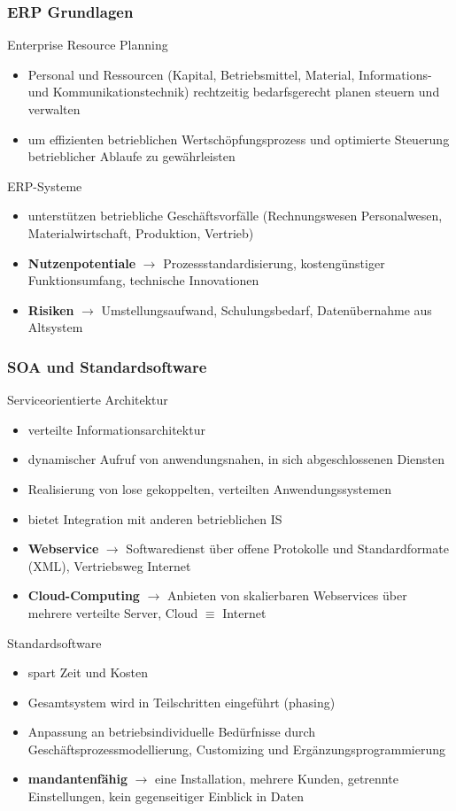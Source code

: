 \subsubsection{ERP Grundlagen}
Enterprise Resource Planning

\begin{itemize}
  \item Personal und Ressourcen (Kapital, Betriebsmittel, Material, Informations- und Kommunikationstechnik) rechtzeitig bedarfsgerecht planen steuern und verwalten
  \item um effizienten betrieblichen Wertschöpfungsprozess und optimierte Steuerung betrieblicher Ablaufe zu gewährleisten
\end{itemize}

ERP-Systeme

\begin{itemize}
  \item unterstützen betriebliche Geschäftsvorfälle (Rechnungswesen Personalwesen, Materialwirtschaft, Produktion, Vertrieb)
  \item \textbf{Nutzenpotentiale} $\rightarrow$ Prozessstandardisierung, kostengünstiger Funktionsumfang, technische Innovationen
  \item \textbf{Risiken} $\rightarrow$ Umstellungsaufwand, Schulungsbedarf, Datenübernahme aus Altsystem
\end{itemize}

\clearpage
\subsubsection{SOA und Standardsoftware}
Serviceorientierte Architektur

\begin{itemize}
  \item verteilte Informationsarchitektur
  \item dynamischer Aufruf von anwendungsnahen, in sich abgeschlossenen Diensten
  \item Realisierung von lose gekoppelten, verteilten Anwendungssystemen
  \item bietet Integration mit anderen betrieblichen IS
  \item \textbf{Webservice} $\rightarrow$ Softwaredienst über offene Protokolle und Standardformate (XML), Vertriebsweg Internet
  \item \textbf{Cloud-Computing} $\rightarrow$ Anbieten von skalierbaren Webservices über mehrere verteilte Server, Cloud $\equiv$ Internet 
\end{itemize}

Standardsoftware

\begin{itemize}
  \item spart Zeit und Kosten
  \item Gesamtsystem wird in Teilschritten eingeführt (phasing)
  \item Anpassung an betriebsindividuelle Bedürfnisse durch Geschäftsprozessmodellierung, Customizing und Ergänzungsprogrammierung
  \item \textbf{mandantenfähig} $\rightarrow$ eine Installation, mehrere Kunden, getrennte Einstellungen, kein gegenseitiger Einblick in Daten
\end{itemize}